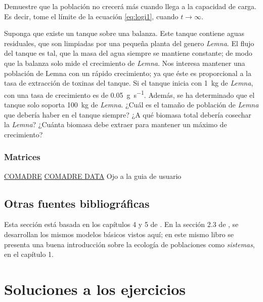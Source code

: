 \documentclass[12pt,letterpaper,]{book}
\let\BeginKnitrBlock\begin \let\EndKnitrBlock\end
\begin{document}
\BeginKnitrBlock{exercise}
\protect\hypertarget{exr:logGrowth2}{}{\label{exr:logGrowth2} }Demuestre que
la población no crecerá más cuando llega a la capacidad de carga. Es
decir, tome el límite de la ecuación \eqref{eq:logi1}, cuando
\(t \to \infty\).
\EndKnitrBlock{exercise}

\BeginKnitrBlock{exercise}
\protect\hypertarget{exr:logGrowth3}{}{\label{exr:logGrowth3} }Suponga que
existe un tanque sobre una balanza. Este tanque contiene aguas
residuales, que son limpiadas por una pequeña planta del genero
\emph{Lemna}. El flujo del tanque es tal, que la masa del agua siempre
se mantiene constante; de modo que la balanza solo mide el crecimiento
de \emph{Lemna}. Nos interesa mantener una población de Lemna con un
rápido crecimiento; ya que éste es proporcional a la tasa de extracción
de toxinas del tanque. Si el tanque inicia con \SI{1}{\kilogram} de
\emph{Lemna}, con una tasa de crecimiento es de
\SI{0.05}{\gram\per\second}. Además, se ha determinado que el tanque
solo soporta \SI{100}{\kilogram} de \emph{Lemna}. ¿Cuál es el tamaño de
población de \emph{Lemna} que debería haber en el tanque siempre? ¿A qué
biomasa total debería cosechar la \emph{Lemna}? ¿Cuánta biomasa debe
extraer para mantener un máximo de crecimiento?
\EndKnitrBlock{exercise}

\subsection{Matrices}\label{matrices}

\href{http://onlinelibrary.wiley.com/doi/10.1111/1365-2656.12482/full}{COMADRE}
\href{http://www.compadre-db.org/Data/Comadre}{COMADRE DATA} Ojo a la
guia de usuario

\section{Otras fuentes
bibliográficas}\label{otras-fuentes-bibliograficas}

Esta sección está basada en los capítulos 4 y 5 de \citet{NealPopBio}.
En la sección 2.3 de \citet{PopSystem}, se desarrollan los mismos
modelos básicos vistos aquí; en este mismo libro se presenta una buena
introducción sobre la ecología de poblaciones como \emph{sistemas}, en
el capítulo 1.

\chapter{Soluciones a los ejercicios}\label{soluciones-a-los-ejercicios}
\end{document}
